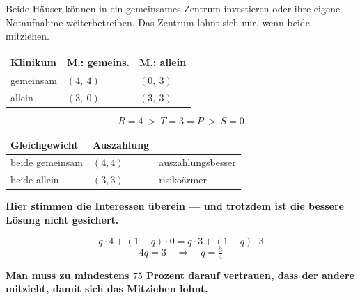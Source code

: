 \begin{merksatz}
Beide Häuser können in ein gemeinsames Zentrum investieren oder ihre eigene Notaufnahme weiterbetreiben. Das Zentrum lohnt sich nur, wenn beide mitziehen.

\begin{center}
{\small
\renewcommand{\arraystretch}{1.6}
\begin{tabular}{@{}P{2.6cm}P{2.4cm}P{2.4cm}@{}}
\toprule
\textbf{Klinikum} & \textbf{M.: gemeins.} & \textbf{M.: allein}\\
\midrule
gemeinsam & $(4,\ 4)$ & $(0,\ 3)$\\
allein & $(3,\ 0)$ & $(3,\ 3)$\\
\bottomrule
\end{tabular}}
\end{center}

\[ R = 4 \ >\ T = 3 = P \ >\ S = 0 \]

\begin{center}
{\small
\renewcommand{\arraystretch}{1.5}
\begin{tabular}{@{}P{2.6cm}P{2.0cm}P{3.0cm}@{}}
\toprule
\textbf{Gleichgewicht} & \textbf{Auszahlung} & \\
\midrule
beide gemeinsam & $(4,4)$ & \textcolor{gruen}{auszahlungsbesser}\\
beide allein & $(3,3)$ & \textcolor{akzent}{risikoärmer}\\
\bottomrule
\end{tabular}}
\end{center}

\begin{center}
\begin{minipage}{0.9\textwidth}
\textbf{Hier stimmen die Interessen überein --- und trotzdem ist die bessere Lösung nicht gesichert.}
\end{minipage}
\end{center}

\[ q\cdot4 + (1-q)\cdot0 = q\cdot3 + (1-q)\cdot3 \]
\[ 4q = 3 \quad\Longrightarrow\quad q = \tfrac34 \]

\begin{center}
\begin{minipage}{0.9\textwidth}
\textbf{Man muss zu mindestens $75$ Prozent darauf vertrauen, dass der andere mitzieht, damit sich das Mitziehen lohnt.}
\end{minipage}
\end{center}


\end{merksatz}

